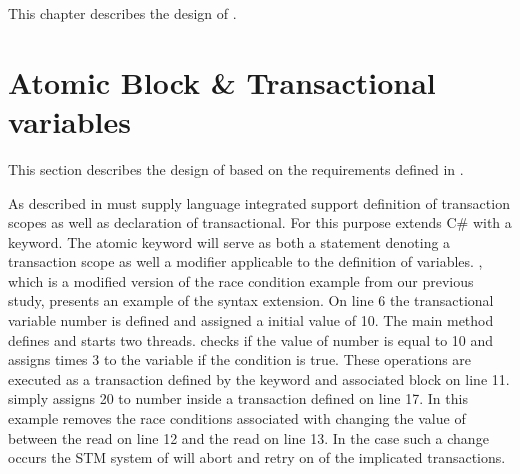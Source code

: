 \makeatletter {}\makeatother
{}
This chapter describes the design of \stmname.
\label{chap:stm_design}
\section{Atomic Block \& Transactional variables}
\label{sec:stm_design}
This section describes the design of \stmnamesp based on the requirements defined in .

As described in  \stmnamesp must supply language integrated support definition of transaction scopes as well as declaration of transactional. For this purpose \stmnamesp extends C\# with a  keyword. The atomic keyword will serve as both a statement denoting a transaction scope as well a modifier applicable to the definition of variables. , which is a modified version of the race condition example from our previous study\cite[p. 23]{dpt907e14trending}, presents an example of the syntax extension. On line 6 the transactional variable number is defined and assigned a initial value of 10. The main method defines and starts two threads.  checks if the value of number is equal to 10 and assigns  times 3 to the variable if the condition is true. These operations are executed as a transaction defined by the  keyword and associated block on line 11.  simply assigns 20 to number inside a transaction defined on line 17. In this example \stmnamesp removes the race conditions associated with  changing the value of  between the read on line 12 and the read on line 13. In the case such a change occurs the \ac{STM} system of \stmnamesp will abort and retry on of the implicated transactions.
 
